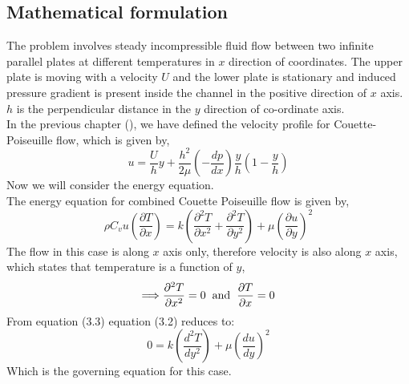 \documentclass[14pt,one side, a4paper]{extbook}
\begin{document}
	 	\subsection{Mathematical formulation}
	 	The problem involves steady incompressible fluid flow between two infinite parallel plates at different temperatures in $x$ direction of coordinates.
	 	The upper plate is moving with a velocity $U$ and the lower plate is  stationary and induced pressure gradient is present inside the channel in the positive direction of $x$ axis. $h$ is the perpendicular distance in the $y$ direction of co-ordinate axis.
	 	\\In the previous chapter (\pageref{Equa}), we have defined the velocity profile for Couette-Poiseuille flow, which is given by,
	 	\begin{equation}
	 		u=\frac{U}{h}y+\frac{h^{2}}{2\mu}\left(-\frac{dp}{dx}\right)\frac{y}{h}\left(1-\frac{y}{h}\right)
	 	\end{equation}  
	 	Now we will consider the energy equation.
	 	\\{The energy equation for combined Couette Poiseuille flow is given by,
	 		\begin{equation}
	 			\rho C_{v}u\left(\frac{\partial T}{\partial x}\right)=k\left(\frac{\partial^{2}T}{\partial x^{2}}+\frac{\partial^{2}T}{\partial y^{2}}\right)+\mu\left(\frac{\partial u}{\partial y}\right)^{2}
	 	\end{equation}}
	 	The flow in this case is along $x$ axis only, therefore velocity is also along $x$ axis, which states that temperature is a function of $y$,
	 	\begin{equation}
	 		\Longrightarrow \frac{\partial^{2}T}{\partial x^{2}}=0\hspace*{0.2cm}\textrm{and}\hspace*{0.2cm}\frac{\partial T}{\partial x}=0
	 	\end{equation} 
	 	From equation (3.3) equation (3.2) reduces to:
	 	\begin{equation}
	 		0=k\left(\frac{d^{2}T} {dy^{2}}\right)+\mu\left(\frac{d u}{d y}\right)^{2}
	 	\end{equation}
	 	Which is the governing equation for this case.
\end{document}
